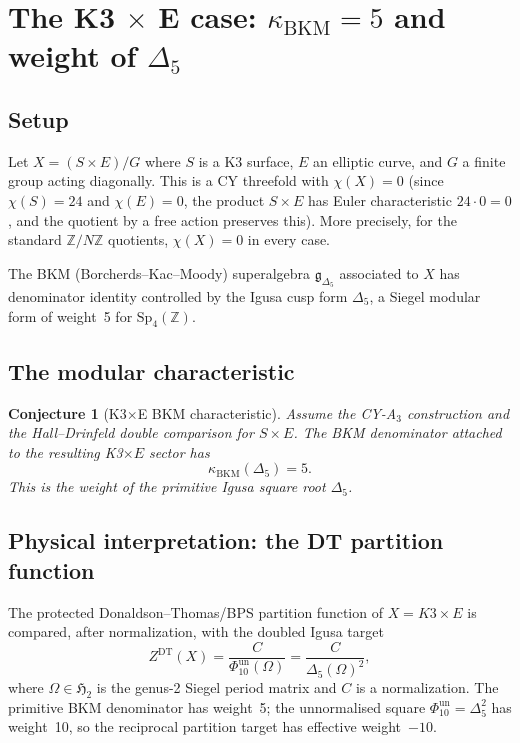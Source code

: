 \documentclass[11pt]{article}
\newtheorem{conjecture}[theorem]{Conjecture}
\theoremstyle{definition}
\theoremstyle{remark}
\begin{document}
\section{The K3 $\times$ E case: $\kappa_{\mathrm{BKM}} = 5$ and weight of $\Delta_5$}
\label{sec:k3-times-e}

\subsection{Setup}

Let $X = (S \times E)/G$ where $S$ is a K3 surface, $E$ an elliptic
curve, and $G$ a finite group acting diagonally. This is a CY threefold
with $\chi(X) = 0$ (since $\chi(S) = 24$ and $\chi(E) = 0$, the product
$S \times E$ has Euler characteristic $24 \cdot 0 = 0$, and the quotient
by a free action preserves this). More precisely, for the standard
$\mathbb{Z}/N\mathbb{Z}$ quotients, $\chi(X) = 0$ in every case.

The BKM (Borcherds--Kac--Moody) superalgebra $\mathfrak{g}_{\Delta_5}$
associated to $X$ has denominator identity controlled by the Igusa cusp
form $\Delta_5$, a Siegel modular form of weight~5 for $\mathrm{Sp}_4(\mathbb{Z})$.

\subsection{The modular characteristic}

\begin{conjecture}[K3$\times$E BKM characteristic]
\label{conj:k3e-bkm-characteristic}
Assume the CY-A$_3$ construction and the Hall--Drinfeld double comparison
for $S\times E$. The BKM denominator attached to the resulting
K3$\times E$ sector has
\begin{equation}\label{eq:bkm-weight-k3e}
 \kappa_{\mathrm{BKM}}(\Delta_5) = 5.
\end{equation}
This is the weight of the primitive Igusa square root $\Delta_5$.
\end{conjecture}

\subsection{Physical interpretation: the DT partition function}

The protected Donaldson--Thomas/BPS partition function of
$X = K3 \times E$ is compared, after normalization, with the doubled
Igusa target
\begin{equation}\label{eq:dt-k3e}
 Z^{\mathrm{DT}}(X)
 = \frac{C}{\Phi_{10}^{\mathrm{un}}(\Omega)}
 = \frac{C}{\Delta_5(\Omega)^2},
\end{equation}
where $\Omega \in \mathfrak{H}_2$ is the genus-2 Siegel period matrix and
$C$ is a normalization. The primitive BKM denominator has weight~5; the
unnormalised square
$\Phi_{10}^{\mathrm{un}}=\Delta_5^2$ has weight~10, so the reciprocal
partition target has effective weight~$-10$.
\end{document}
